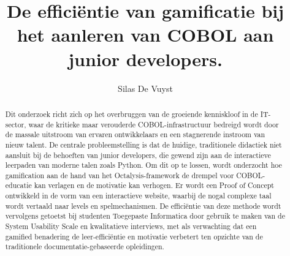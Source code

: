 \documentclass{hogent-article}
\title{De efficiëntie van gamificatie bij het aanleren van COBOL aan junior developers.}
\author{Silas De Vuyst}
\begin{document}
\begin{abstract}
  Dit onderzoek richt zich op het overbruggen van de groeiende kenniskloof in de IT-sector, 
  waar de kritieke maar verouderde COBOL-infrastructuur bedreigd wordt door de massale uitstroom van ervaren ontwikkelaars en een stagnerende instroom van nieuw talent.
  De centrale probleemstelling is dat de huidige, traditionele didactiek niet aansluit bij de behoeften van junior developers, 
  die gewend zijn aan de interactieve leerpaden van moderne talen zoals Python. 
  Om dit op te lossen, wordt onderzocht hoe gamification aan de hand van het Octalysis-framework de drempel voor COBOL-educatie kan verlagen en de motivatie kan verhogen.
  Er wordt een Proof of Concept ontwikkeld in de vorm van een interactieve website, waarbij de nogal complexe taal wordt vertaald naar levels en spelmechanismen. 
  De efficiëntie van deze methode wordt vervolgens getoetst bij studenten Toegepaste Informatica door gebruik te maken van de System Usability Scale en kwalitatieve interviews, 
  met als verwachting dat een gamified benadering de leer-efficiëntie en motivatie verbetert ten opzichte van de traditionele documentatie-gebaseerde opleidingen.
\end{abstract}

\tableofcontents



\printbibliography[heading=bibintoc]
\end{document}
